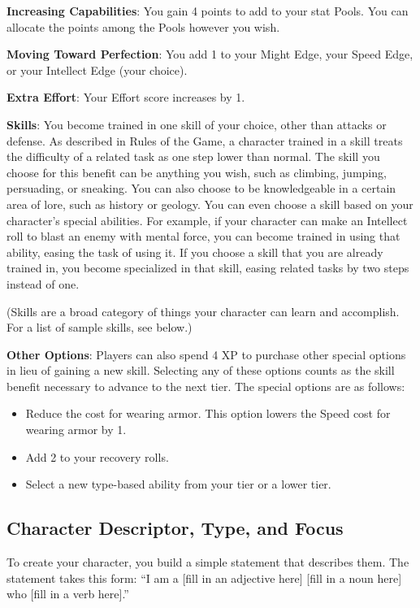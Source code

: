 \begin{multicols}{2}
\textbf{Increasing Capabilities}: You gain 4 points to add to your stat Pools. You can allocate the points among the Pools however you wish.

\textbf{Moving Toward Perfection}: You add 1 to your Might Edge, your Speed Edge, or your Intellect Edge (your choice).

\textbf{Extra Effort}: Your Effort score increases by 1.

\textbf{Skills}: You become trained in one skill of your choice, other than attacks or defense. As described in Rules of the Game, a character trained in a skill treats the difficulty of a related task as one step lower than normal. The skill you choose for this benefit can be anything you wish, such as climbing, jumping, persuading, or sneaking. You can also choose to be knowledgeable in a certain area of lore, such as history or geology. You can even choose a skill based on your character’s special abilities. For example, if your character can make an Intellect roll to blast an enemy with mental force, you can become trained in using that ability, easing the task of using it. If you choose a skill that you are already trained in, you become specialized in that skill, easing related tasks by two steps instead of one.

(Skills are a broad category of things your character can learn and accomplish. For a list of sample skills, see below.)

\textbf{Other Options}: Players can also spend 4 XP to purchase other special options in lieu of gaining a new skill. Selecting any of these options counts as the skill benefit necessary to advance to the next tier. The special options are as follows:

\begin{itemize}
\item Reduce the cost for wearing armor. This option lowers the Speed cost for wearing armor by 1. 
\item Add 2 to your recovery rolls.
\item Select a new type-based ability from your tier or a lower tier.
\end{itemize}

\subsection{Character Descriptor, Type, and Focus}

To create your character, you build a simple statement that describes them. The statement takes this form: “I am a [fill in an adjective here] [fill in a noun here] who [fill in a verb here].”


\end{multicols}
